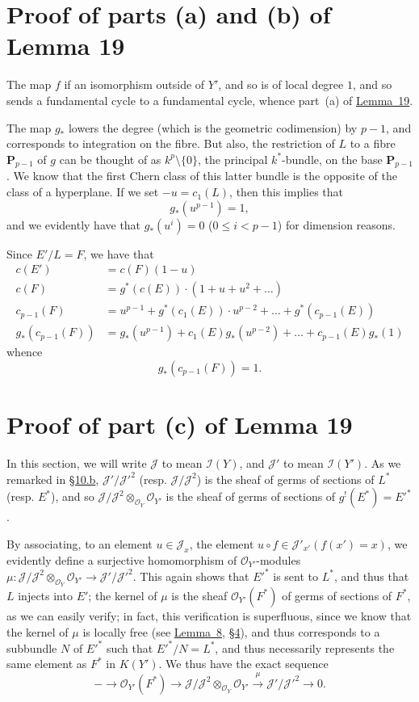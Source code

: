 \documentclass{article}
\theoremstyle{plain}
\theoremstyle{definition}
\newcommand{\scr}[1]{{\mathscr{#1}}}
\newcommand{\PP}{\mathbf{P}}
\renewcommand{\leq}{\leqslant}
\newcommand{\oldpage}[1]{\marginpar{\footnotesize$\Big\vert$ \textit{p.~#1}}}
\begin{document}
\section{Proof of parts (a) and (b) of Lemma 19}
\label{section14}

The map $f$ if an isomorphism outside of $Y'$, and so is of local degree $1$, and so sends a fundamental cycle to a fundamental cycle, whence part~(a) of \hyperref[lemma19]{Lemma~19}.

The map $g_*$ lowers the degree (which is the geometric codimension) by $p-1$, and corresponds to integration on the fibre.
But also, the restriction of $L$ to a fibre $\PP_{p-1}$ of $g$ can be thought of as $k^p\setminus\{0\}$, the principal $k^*$-bundle, on the base $\PP_{p-1}$.
We know that the first Chern class of this latter bundle is the opposite of the class of a hyperplane.
If we
\oldpage{130}
set $-u=c_1(L)$, then this implies that
\[
  g_*(u^{p-1}) = 1,
\]
and we evidently have that $g_*(u^i)=0$ ($0\leq i<p-1$) for dimension reasons.

Since $E'/L=F$, we have that
\begin{align*}
  c(E') &= c(F)(1-u)
\\c(F) &= g^*(c(E))\cdot(1+u+u^2+\ldots)
\\c_{p-1}(F) &= u^{p-1}+g^*(c_1(E))\cdot u^{p-2} +\ldots+ g^*(c_{p-1}(E))
\\g_*(c_{p-1}(F)) &= g_*(u^{p-1})+c_1(E)g_*(u^{p-2}) +\ldots+ c_{p-1}(E)g_*(1)
\end{align*}
whence
\[
  g_*(c_{p-1}(F)) = 1.
\]


\section{Proof of part (c) of Lemma 19}
\label{section15}

In this section, we will write $\scr{J}$ to mean $\scr{I}(Y)$, and $\scr{J}'$ to mean $\scr{I}(Y')$.
As we remarked in \hyperref[subsection10b]{\S10.b}, $\scr{J}'/\scr{J}'^2$ (resp. $\scr{J}/\scr{J}^2$) is the sheaf of germs of sections of $L^*$ (resp. $E^*$), and so $\scr{J}/\scr{J}^2\otimes_{\scr{O}_Y}\scr{O}_{Y'}$ is the sheaf of germs of sections of $g^!(E^*)=E'^*$.

By associating, to an element $u\in\scr{J}_x$, the element $u\circ f\in\scr{J}'_{x'}(f(x')=x)$, we evidently define a surjective homomorphism of $\scr{O}_{Y'}$-modules $\mu\colon\scr{J}/\scr{J}^2\otimes_{\scr{O}_Y}\scr{O}_{Y'}\to\scr{J}'/\scr{J}'^2$.
This again shows that $E'^*$ is sent to $L^*$, and thus that $L$ injects into $E'$;
the kernel of $\mu$ is the sheaf $\scr{O}_{Y'}(F^*)$ of germs of sections of $F^*$, as we can easily verify;
in fact, this verification is superfluous, since we know that the kernel of $\mu$ is locally free (see \hyperref[lemma8]{Lemma~8}, \hyperref[section4]{\S4}), and thus corresponds to a subbundle $N$ of $E'^*$ such that $E'^*/N=L^*$, and thus necessarily represents the same element as $F^*$ in $K(Y')$.
We thus have the exact sequence
\[
\label{section15equation1}
  - \to \scr{O}_{Y'}(F^*) \to \scr{J}/\scr{J}^2\otimes_{\scr{O}_Y}\scr{O}_{Y'} \xrightarrow{\mu} \scr{J}'/\scr{J}'^2 \to 0.
  \tag{1}
\]
\end{document}
